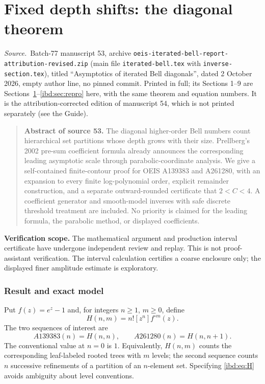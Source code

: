 \documentclass[11pt,letterpaper]{article}
\theoremstyle{remark}\newtheorem{remark}[theorem]{Remark}
\newenvironment{partsource}{\par\medskip\noindent\begin{minipage}{\linewidth}\small\raggedright\textit{Source.}\ }{\end{minipage}\par\medskip}
\begin{document}
\part{Fixed depth shifts: the diagonal theorem}\label{ibd:part:diag}
\begin{partsource}Batch-77 manuscript 53, archive \texttt{oeis-iterated-bell-report-attribution-revised.zip} (main file \texttt{iterated-bell.tex} with \texttt{inverse-section.tex}), titled ``Asymptotics of iterated Bell diagonals'', dated 2 October 2026, empty author line, no pinned commit. Printed in full; its Sections 1--9 are Sections~\ref{ibd:sec:result}--\ref{ibd:sec:repro} here, with the same theorem and equation numbers. It is the attribution-corrected edition of manuscript 54, which is not printed separately (see the Guide).\end{partsource}
\begin{quote}\small\textbf{Abstract of source 53.} The diagonal higher-order Bell numbers count hierarchical set partitions whose depth grows with their size. Prellberg's 2002 pre-sum coefficient formula already announces the corresponding leading asymptotic scale through parabolic-coordinate analysis. We give a self-contained finite-contour proof for OEIS A139383 and A261280, with an expansion to every finite log-polynomial order, explicit remainder construction, and a separate outward-rounded certificate that $2<C<4$. A coefficient generator and smooth-model inverses with safe discrete threshold treatment are included. No priority is claimed for the leading formula, the parabolic method, or displayed coefficients.\end{quote}
\noindent\textbf{Verification scope.} The mathematical argument and production interval certificate have undergone independent review and replay. This is not proof-assistant verification. The interval calculation certifies a coarse enclosure only; the displayed finer amplitude estimate is exploratory.

\section{Result and exact model}\label{ibd:sec:result}
Put $f(z)=e^z-1$ and, for integers $n\geq1$, $m\geq0$, define
\begin{equation}\label{ibd:eq:H}
 H(n,m)=n![z^n]f^{\circ m}(z).
\end{equation}
The two sequences of interest are
\[
 A139383(n)=H(n,n),\qquad A261280(n)=H(n,n+1).
\]
The conventional value at $n=0$ is $1$. Equivalently, $H(n,m)$ counts the corresponding leaf-labeled rooted trees with $m$ levels; the second sequence counts $n$ successive refinements of a partition of an $n$-element set. Specifying \eqref{ibd:eq:H} avoids ambiguity about level conventions.
\end{document}
